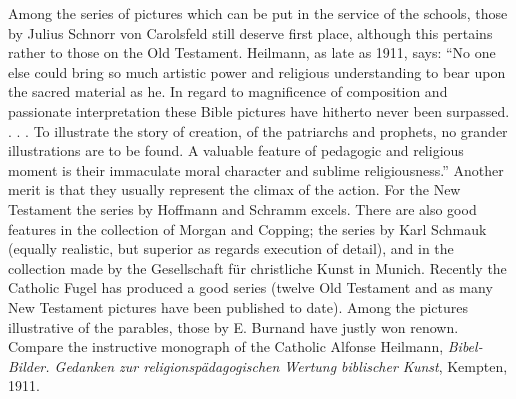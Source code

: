 Among the series of pictures which can be put in the service of the schools, those by Julius Schnorr von Carolsfeld still deserve first place, although this pertains rather to those on the Old Testament. Heilmann, as late as 1911, says: “No one else could bring so much artistic power and religious understanding to bear upon the sacred material as he. In regard to magnificence of composition and passionate interpretation these Bible pictures have hitherto never been surpassed. . . . To illustrate the story of creation, of the patriarchs and prophets, no grander illustrations are to be found. A valuable feature of pedagogic and religious moment is their immaculate moral character and sublime religiousness.” Another merit is that they usually represent the climax of the action. For the New Testament the series by Hoffmann and Schramm excels. There are also good features in the collection of Morgan and Copping; the series by Karl Schmauk (equally realistic, but superior as regards execution of detail), and in the collection made by the Gesellschaft für christliche Kunst in Munich. Recently the Catholic Fugel has produced a good series (twelve Old Testament and as many New Testament pictures have been published to date). Among the pictures illustrative of the parables, those by E. Burnand have justly won renown. Compare the instructive monograph of the Catholic Alfonse Heilmann, \emph{Bibel-Bilder. Gedanken zur religionspädagogischen Wertung biblischer Kunst}, Kempten, 1911.
